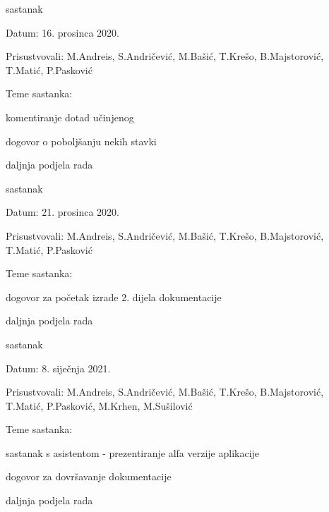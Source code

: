 \begin{packed_enum}
\item  sastanak
\item[] \begin{packed_item}
	\item Datum: 16. prosinca 2020.
	\item Prisustvovali: M.Andreis, S.Andričević, M.Bašić, T.Krešo, B.Majstorović, T.Matić, P.Pasković
	\item Teme sastanka:
	\begin{packed_item}
		\item komentiranje dotad učinjenog
		\item dogovor o poboljšanju nekih stavki
		\item daljnja podjela rada
	\end{packed_item}
\end{packed_item}

\item  sastanak
\item[] \begin{packed_item}
	\item Datum: 21. prosinca 2020.
	\item Prisustvovali: M.Andreis, S.Andričević, M.Bašić, T.Krešo, B.Majstorović, T.Matić, P.Pasković
	\item Teme sastanka:
	\begin{packed_item}
		\item dogovor za početak izrade 2. dijela dokumentacije
		\item daljnja podjela rada
	\end{packed_item}
\end{packed_item}

\item  sastanak
\item[] \begin{packed_item}
	\item Datum: 8. siječnja 2021.
	\item Prisustvovali: M.Andreis, S.Andričević, M.Bašić, T.Krešo, B.Majstorović, T.Matić, P.Pasković, M.Krhen, M.Sušilović
	\item Teme sastanka:
	\begin{packed_item}
		\item sastanak s asistentom - prezentiranje alfa verzije aplikacije
		\item dogovor za dovršavanje dokumentacije
		\item daljnja podjela rada
	\end{packed_item}
\end{packed_item}

			
			
		\end{packed_enum}
		
